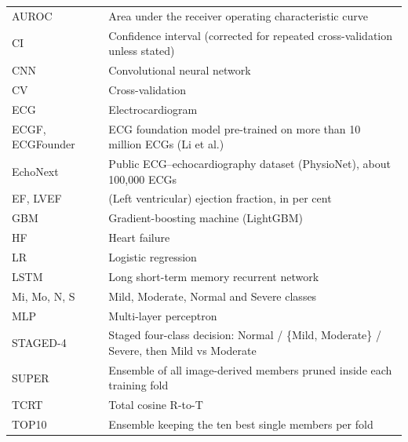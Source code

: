 \renewcommand{\contentsname}{Contents}
\begingroup\setstretch{\liststretch}
\tableofcontents
\clearpage
{}
\listoffigures
\clearpage
{}
\listoftables
\clearpage
\endgroup

\clearpage
\begingroup\setstretch{\liststretch}
\thispagestyle{fancy}
\vspace*{7pt}%
\newcommand{\abbrtable}[1]{\noindent\hspace*{18pt}\begin{tabular}{@{}>{\raggedright\arraybackslash}p{2.6cm}@{\hspace{12pt}}>{\raggedright\arraybackslash}p{\dimexpr\linewidth-18pt-2.6cm-12pt\relax}@{}}#1\end{tabular}\par}
\abbrtable{%
AUROC & Area under the receiver operating characteristic curve\\
CI & Confidence interval (corrected for repeated cross-validation unless stated)\\
CNN & Convolutional neural network\\
CV & Cross-validation\\
ECG & Electrocardiogram\\
ECGF, ECGFounder & ECG foundation model pre-trained on more than 10 million ECGs (Li et al.)\\
EchoNext & Public ECG--echocardiography dataset (PhysioNet), about 100,000 ECGs\\
EF, LVEF & (Left ventricular) ejection fraction, in per cent\\
GBM & Gradient-boosting machine (LightGBM)\\
HF & Heart failure\\
LR & Logistic regression\\
LSTM & Long short-term memory recurrent network\\
Mi, Mo, N, S & Mild, Moderate, Normal and Severe classes\\
MLP & Multi-layer perceptron\\
STAGED-4 & Staged four-class decision: Normal / \{Mild, Moderate\} / Severe, then Mild vs Moderate\\
SUPER & Ensemble of all image-derived members pruned inside each training fold\\
TCRT & Total cosine R-to-T\\
TOP10 & Ensemble keeping the ten best single members per fold\\
}


